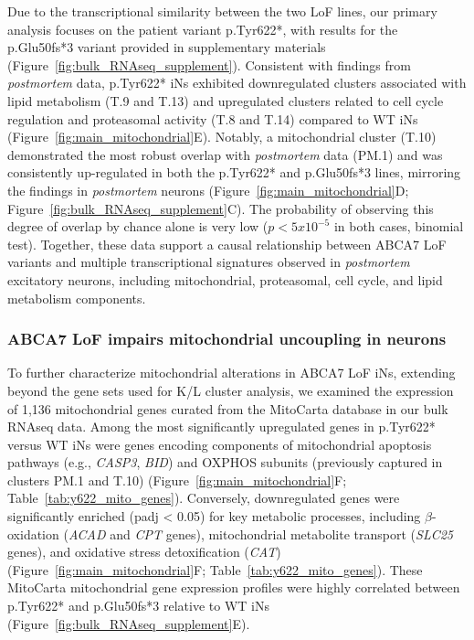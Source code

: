 Due to the transcriptional similarity between the two LoF lines, our primary analysis focuses on the patient variant p.Tyr622*, with results for the p.Glu50fs*3 variant provided in supplementary materials (Figure~\ref{fig:bulk_RNAseq_supplement}). Consistent with findings from \textit{postmortem} data, p.Tyr622* iNs exhibited downregulated clusters associated with lipid metabolism (T.9 and T.13) and upregulated clusters related to cell cycle regulation and proteasomal activity (T.8 and T.14) compared to WT iNs (Figure~\ref{fig:main_mitochondrial}E). Notably, a mitochondrial cluster (T.10) demonstrated the most robust overlap with \textit{postmortem} data (PM.1) and was consistently up-regulated in both the p.Tyr622* and p.Glu50fs*3 lines, mirroring the findings in \textit{postmortem} neurons (Figure~\ref{fig:main_mitochondrial}D; Figure~\ref{fig:bulk_RNAseq_supplement}C). The probability of observing this degree of overlap by chance alone is very low ($p<5x10^{-5}$ in both cases, binomial test). Together, these data support a causal relationship between ABCA7 LoF variants and multiple transcriptional signatures observed in \textit{postmortem} excitatory neurons, including mitochondrial, proteasomal, cell cycle, and lipid metabolism components.

\subsubsection{ABCA7 LoF impairs mitochondrial uncoupling in neurons}
To further characterize mitochondrial alterations in ABCA7 LoF iNs, extending beyond the gene sets used for K/L cluster analysis, we examined the expression of 1,136 mitochondrial genes curated from the MitoCarta database in our bulk RNAseq data. Among the most significantly upregulated genes in p.Tyr622* versus WT iNs were genes encoding components of mitochondrial apoptosis pathways (e.g., \textit{CASP3}, \textit{BID}) and OXPHOS subunits (previously captured in clusters PM.1 and T.10) (Figure~\ref{fig:main_mitochondrial}F; Table~\ref{tab:y622_mito_genes}). Conversely, downregulated genes were significantly enriched (padj < 0.05) for key metabolic processes, including $\beta$-oxidation (\textit{ACAD} and \textit{CPT} genes), mitochondrial metabolite transport (\textit{SLC25} genes), and oxidative stress detoxification (\textit{CAT}) (Figure~\ref{fig:main_mitochondrial}F; Table~\ref{tab:y622_mito_genes}). These MitoCarta mitochondrial gene expression profiles were highly correlated between p.Tyr622* and p.Glu50fs*3 relative to WT iNs (Figure~\ref{fig:bulk_RNAseq_supplement}E).

